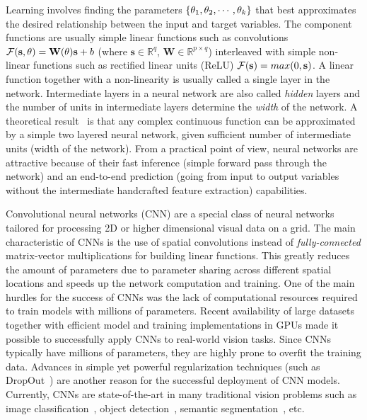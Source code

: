 Learning involves finding the parameters $\{\mathbf{\theta}_1, \mathbf{\theta}_2, \cdots, \mathbf{\theta}_k\}$
that best approximates the desired relationship between the input and target variables.
The component functions are usually simple linear functions such as convolutions
$\mathcal{F}(\mathbf{s},\theta)=\mathbf{W(\mathbf{\theta})}\mathbf{s}+b$ (where $\mathbf{s} \in \mathbb{R}^q$,
$\mathbf{W} \in \mathbb{R}^{p \times q}$) interleaved
with simple non-linear functions such as rectified linear units (ReLU) $\mathcal{F}(\mathbf{s})=max(0,\mathbf{s})$.
A linear function together with a non-linearity is usually called a single layer
in the network. Intermediate layers in a neural network are also called \textit{hidden}
layers and the number of units in intermediate layers determine the \textit{width}
of the network.
A theoretical result~\cite{csaji2001approximation,hornik1991approximation}
is that any complex continuous function can be approximated by a simple two
layered neural network, given sufficient number of intermediate units (width of
the network).
From a practical point of view, neural networks are attractive because of their
fast inference (simple forward pass through the network) and an end-to-end prediction
(going from input to output variables without the intermediate handcrafted feature
extraction) capabilities.

Convolutional neural networks (CNN) are a special class of neural networks
tailored for processing 2D or higher dimensional visual data on a grid.
The main characteristic of CNNs is the use of spatial convolutions instead of
\textit{fully-connected} matrix-vector multiplications for building linear
functions. This greatly reduces the amount of parameters due to parameter sharing
across different spatial locations and speeds up the
network computation and training. One of the main hurdles for the success of
CNNs was the lack of computational resources required to train models
with millions of parameters. Recent availability of large datasets together
with efficient model and training implementations in GPUs made it possible
to successfully apply CNNs to real-world vision tasks. Since CNNs typically have
millions of parameters, they are highly prone to overfit the training data.
Advances in simple yet powerful regularization techniques (such as
DropOut~\cite{srivastava2014dropout}) are another reason for the successful deployment of
CNN models. Currently, CNNs are state-of-the-art
in many traditional vision problems such as image classification~\cite{he2015deep,krizhevsky2012imagenet},
object detection~\cite{girshick2014rich,redmon2015you,ren2015faster},
semantic segmentation~\cite{long2014fully,chen2016deeplab}, etc.

